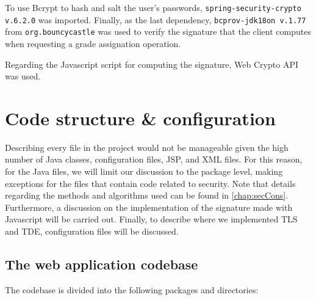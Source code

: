 \noindent To use Bcrypt to hash and salt the user's passwords, \texttt{spring-security-crypto v.6.2.0} was imported. Finally, as the last dependency, \texttt{bcprov-jdk18on v.1.77} from \texttt{org.bouncycastle} was used to verify the signature that the client computes when requesting a grade assignation operation.

\noindent Regarding the Javascript script for computing the signature, Web Crypto API was used.

\section{Code structure \& configuration}

Describing every file in the project would not be manageable given the high number of Java classes, configuration files, JSP, and XML files. For this reason, for the Java files, we will limit our discussion to the package level, making exceptions for the files that contain code related to security. Note that details regarding the methods and algorithms used can be found in \autoref{chap:secCons}. Furthermore, a discussion on the implementation of the signature made with Javascript will be carried out. Finally, to describe where we implemented TLS and TDE, configuration files will be discussed.

\subsection*{The web application codebase}

The codebase is divided into the following packages and directories:

